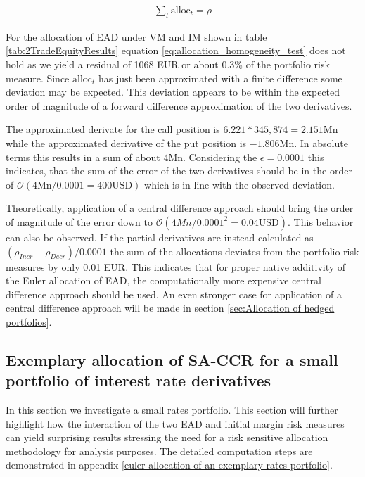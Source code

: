 \documentclass[../Thesis_AHoecherl.tex]{subfiles}
\begin{document}
    \begin{align}
        \label{eq:allocation_homogeneity_test}
        \sum_t{\text{alloc}_t} = \rho
    \end{align}
    
    
    For the allocation of EAD under VM and IM shown in table \ref{tab:2TradeEquityResults} equation \ref{eq:allocation_homogeneity_test} does not hold as we yield a residual of 1068 EUR or about 0.3\% of the portfolio risk measure. Since $\text{alloc}_t$ has just been approximated with a finite difference some deviation may be expected. This deviation appears to be within the expected order of magnitude of a forward difference approximation of the two derivatives.

    The approximated derivate for the call position is $6.221 * 345,874 = 2.151 \text{Mn}$ while the approximated derivative of the put position is $-1.806 \text{Mn}$. 
    In absolute terms this results in a sum of about 4Mn. Considering the $\epsilon = 0.0001$ this indicates, that the sum of the error of the two derivatives should be in the order of $\mathcal{O}\left(4\text{Mn}/0.0001 = 400 \text{USD}\right)$ which is in line with the observed deviation.

    Theoretically, application of a central difference approach should bring the order of magnitude of the error down to $\mathcal{O}\left(4Mn/0.0001^2 = 0.04 \text{USD}\right)$.
     This behavior can also be observed. 
    If the partial derivatives are instead calculated as $(\rho_{Incr}-\rho_{Decr})/0.0001$ the sum of the allocations deviates from the portfolio risk measures by only 0.01 EUR. 
    This indicates that for proper native additivity of the Euler allocation of EAD, the computationally more expensive central difference approach should be used.
    An even stronger case for application of a central difference approach will be made in section \ref{sec:Allocation of hedged portfolios}.

    \subsection{Exemplary allocation of SA-CCR for a small portfolio of interest rate derivatives\label{sec:Exemplary allocation of SA-CCR for a small portfolio of interst rate derivatives}}

    In this section we investigate a small rates portfolio. This section will further highlight how the interaction of the two EAD and initial margin risk measures can yield surprising results stressing the need for a risk sensitive allocation methodology for analysis purposes. The detailed computation steps are demonstrated in appendix \ref{euler-allocation-of-an-exemplary-rates-portfolio}.
\end{document}
